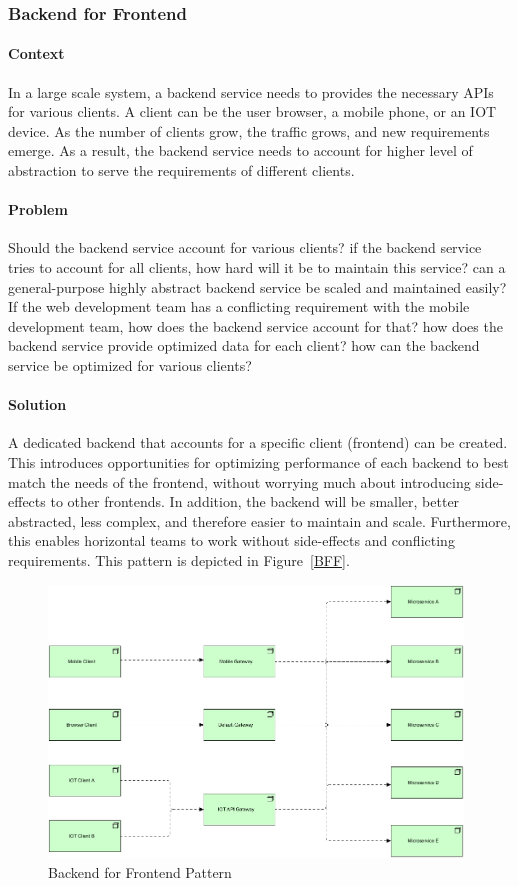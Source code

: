 \documentclass{bmcart}
\begin{document}
\subsubsection{Backend for Frontend}

\paragraph{Context}

In a large scale system, a backend service needs to provides the necessary APIs for various clients. A client can be the user browser, a mobile phone, or an IOT device. As the number of clients grow, the traffic grows, and new requirements emerge. As a result, the backend service needs to account for higher level of abstraction to serve the requirements of different clients. 

\paragraph{Problem}
Should the backend service account for various clients? if the backend service tries to account for all clients, how hard will it be to maintain this service? can a general-purpose highly abstract backend service be scaled and maintained easily? If the web development team has a conflicting requirement with the mobile development team, how does the backend service account for that? how does the backend service provide optimized data for each client? how can the backend service be optimized for various clients? 

\paragraph{Solution}

A dedicated backend that accounts for a specific client (frontend) can be created. This introduces opportunities for optimizing performance of each backend to best match the needs of the frontend, without worrying much about introducing side-effects to other frontends. In addition, the backend will be smaller, better abstracted, less complex, and therefore easier to maintain and scale. Furthermore, this enables horizontal teams to work without side-effects and conflicting requirements. This pattern is depicted in Figure~\ref{BFF}.

\begin{figure}[h]
  \includegraphics[width=11cm]{Media/Backend for Frontend.jpg}
  \caption{Backend for Frontend Pattern}
  \label{BBF}
\end{figure}
\end{document}
